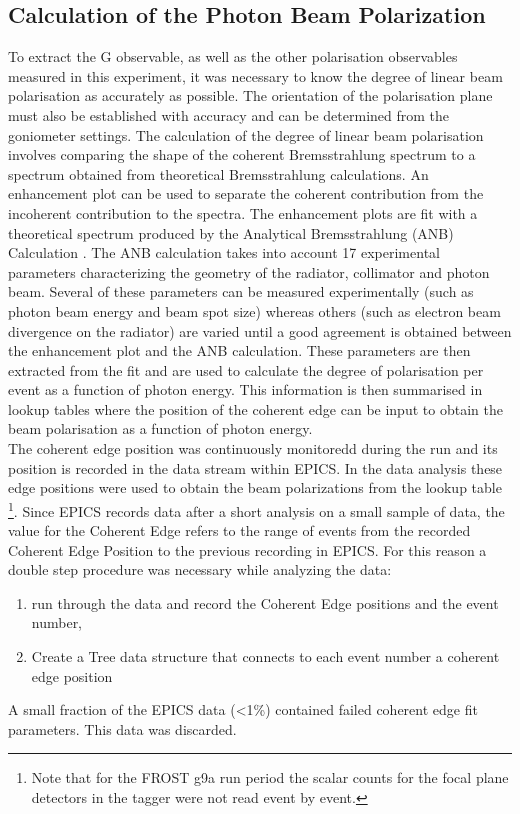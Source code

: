 \subsection{Calculation of the Photon Beam Polarization}\label{ch:calc_ph_pol}
To extract the G observable, as well as the other polarisation observables measured in this experiment, it was necessary to know the degree of linear beam polarisation as accurately as possible. The orientation of the polarisation plane must also be established with accuracy and can be determined from the goniometer settings. The calculation of the degree of linear beam polarisation involves comparing the shape of the coherent Bremsstrahlung spectrum to a spectrum obtained from theoretical Bremsstrahlung calculations. An enhancement plot can be used to separate the coherent contribution from the incoherent contribution to the spectra. The enhancement plots are fit with a theoretical spectrum produced by the Analytical Bremsstrahlung (ANB) Calculation \cite{Natter_2003}\cite{Sabin_2010}. The ANB calculation takes into account 17 experimental parameters characterizing the geometry of the radiator, collimator and photon beam. Several of these parameters can be measured experimentally (such as photon beam energy and beam spot size) whereas others (such as electron beam divergence on the radiator) are varied until a good agreement is obtained between the enhancement plot and the ANB calculation. These parameters are then extracted from the fit and are used to calculate the degree of polarisation per event as a function of photon energy. This information is then summarised in lookup tables \cite{Anderson_table} where the position of the coherent edge can be input to obtain the beam polarisation as a function of photon energy. \\
The coherent edge position was continuously monitoredd during the run and its position is recorded in the data stream within EPICS. In the data analysis these edge positions were used to obtain the beam polarizations from the lookup table \footnote{Note that for the FROST g9a run period the scalar counts for the focal plane detectors in the tagger were not read event by event.}.
 Since EPICS records data after a short analysis on a small sample of data, the value for the Coherent Edge refers to the range of events from the recorded Coherent Edge Position to the previous recording in EPICS. For this reason  a double step procedure was necessary while analyzing the data:
\begin{enumerate}
\item run through the data and record the Coherent Edge positions and the event number,
\item Create a Tree data structure that connects to each event number a coherent edge position 
\end{enumerate}
A small fraction of the EPICS data (<1\%) contained failed coherent edge fit parameters. This data was discarded.



